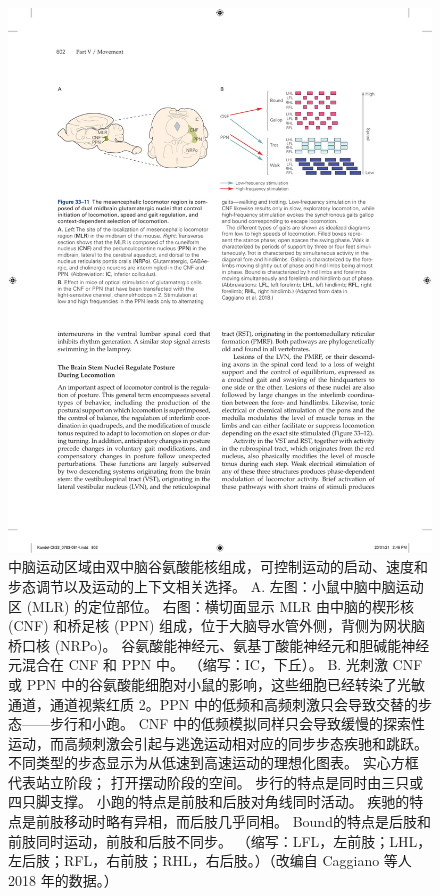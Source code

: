\begin{figure}[htbp]
	\centering
	\includegraphics[width=0.9\linewidth]{chap33/fig_33_11}
	\caption{中脑运动区域由双中脑谷氨酸能核组成，可控制运动的启动、速度和步态调节以及运动的上下文相关选择。 A. 左图：小鼠中脑中脑运动区 (MLR) 的定位部位。 右图：横切面显示 MLR 由中脑的楔形核 (CNF) 和桥足核 (PPN) 组成，位于大脑导水管外侧，背侧为网状脑桥口核 (NRPo)。 谷氨酸能神经元、氨基丁酸能神经元和胆碱能神经元混合在 CNF 和 PPN 中。 （缩写：IC，下丘）。 B. 光刺激 CNF 或 PPN 中的谷氨酸能细胞对小鼠的影响，这些细胞已经转染了光敏通道，通道视紫红质 2。PPN 中的低频和高频刺激只会导致交替的步态——步行和小跑。 CNF 中的低频模拟同样只会导致缓慢的探索性运动，而高频刺激会引起与逃逸运动相对应的同步步态疾驰和跳跃。 不同类型的步态显示为从低速到高速运动的理想化图表。 实心方框代表站立阶段； 打开摆动阶段的空间。 步行的特点是同时由三只或四只脚支撑。 小跑的特点是前肢和后肢对角线同时活动。 疾驰的特点是前肢移动时略有异相，而后肢几乎同相。 Bound的特点是后肢和前肢同时运动，前肢和后肢不同步。 （缩写：LFL，左前肢；LHL，左后肢；RFL，右前肢；RHL，右后肢。）（改编自 Caggiano 等人 2018 年的数据。）}
	\label{fig:33_11}
\end{figure}


